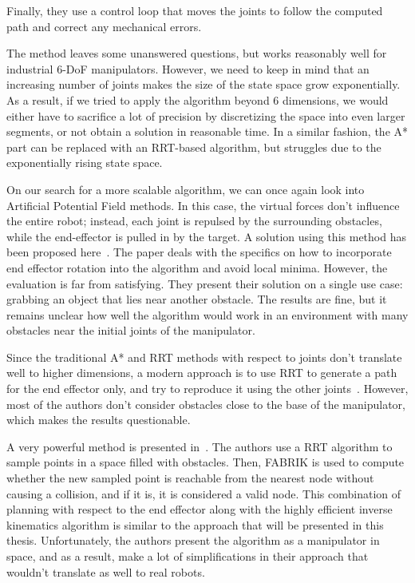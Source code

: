 Finally, they use a control loop that moves the joints to follow the computed path and correct any mechanical errors.

The method leaves some unanswered questions, but works reasonably well for industrial 6-DoF manipulators. However, we need to keep in mind that an increasing number of joints makes the size of the state space grow exponentially. As a result, if we tried to apply the algorithm beyond 6 dimensions, we would either have to sacrifice a lot of precision by discretizing the space into even larger segments, or not obtain a solution in reasonable time. In a similar fashion, the A* part can be replaced with an RRT-based algorithm, but struggles due to the exponentially rising state space.

On our search for a more scalable algorithm, we can once again look into Artificial Potential Field methods. In this case, the virtual forces don't influence the entire robot; instead, each joint is repulsed by the surrounding obstacles, while the end-effector is pulled in by the target. A solution using this method has been proposed here~\cite{aapf}. The paper deals with the specifics on how to incorporate end effector rotation into the algorithm and avoid local minima. However, the evaluation is far from satisfying. They present their solution on a single use case: grabbing an object that lies near another obstacle. The results are fine, but it remains unclear how well the algorithm would work in an environment with many obstacles near the initial joints of the manipulator.

Since the traditional A* and RRT methods with respect to joints don't translate well to higher dimensions, a modern approach is to use RRT to generate a path for the end effector only, and try to reproduce it using the other joints~\cite{RRT_manipulator, rrt_industrial}. However, most of the authors don't consider obstacles close to the base of the manipulator, which makes the results questionable.

A very powerful method is presented in~\cite{rrt_fabrik}. The authors use a RRT algorithm to sample points in a space filled with obstacles. Then, FABRIK is used to compute whether the new sampled point is reachable from the nearest node without causing a collision, and if it is, it is considered a valid node. This combination of planning with respect to the end effector along with the highly efficient inverse kinematics algorithm is similar to the approach that will be presented in this thesis. Unfortunately, the authors present the algorithm as a manipulator in space, and as a result, make a lot of simplifications in their approach that wouldn't translate as well to real robots.

